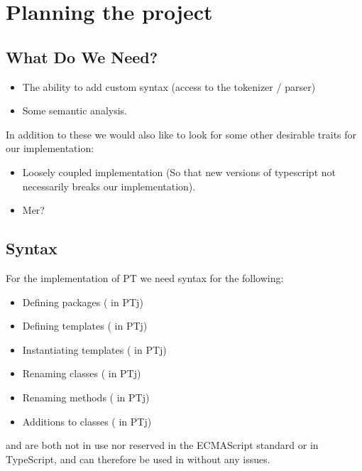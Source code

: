 
\chapter{Planning the project}\label{ch:planning-the-project}

\section{What Do We Need?}\label{sec:what-do-we-need}

\begin{itemize}
    \item The ability to add custom syntax (access to the tokenizer / parser)
    \item Some semantic analysis.
\end{itemize}

In addition to these we would also like to look for some other desirable traits for our implementation:

\begin{itemize}
    \item Loosely coupled implementation (So that new versions of typescript not necessarily breaks our implementation).
    \item Mer?
\end{itemize}

\section{Syntax}\label{sec:syntax}

For the implementation of PT we need syntax for the following:

\begin{itemize}
    \item Defining packages ( in PTj)
    \item Defining templates ( in PTj)
    \item Instantiating templates ( in PTj)
    \item Renaming classes (\codeword{=>} in PTj)
    \item Renaming methods (\codeword{->} in PTj)
    \item Additions to classes ( in PTj)
\end{itemize}

 and  are both not in use nor reserved in the ECMAScript standard or in TypeScript, and can therefore be used in \plname{} without any issues.

